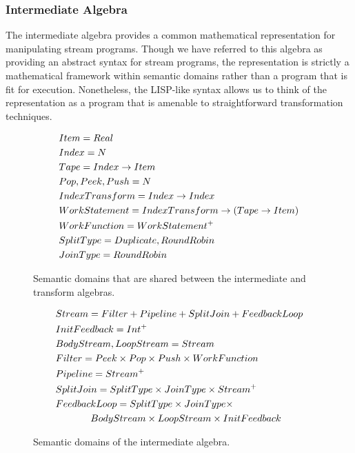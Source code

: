 \subsubsection{Intermediate Algebra}

The intermediate algebra provides a common mathematical representation
for manipulating stream programs.  Though we have referred to this
algebra as providing an abstract syntax for stream programs, the
representation is strictly a mathematical framework within semantic
domains rather than a program that is fit for execution.  Nonetheless,
the LISP-like syntax allows us to think of the representation as a
program that is amenable to straightforward transformation techniques.

\begin{figure}
\begin{align*}
&Item = Real \\
&Index = N \\
&Tape = Index \rightarrow Item \\
&Pop, Peek, Push = N \\ 
&IndexTransform = Index \rightarrow Index \\ 
&WorkStatement = IndexTransform \rightarrow (Tape \rightarrow Item) \\ 
&WorkFunction = WorkStatement^{+} \\
&SplitType = {Duplicate, RoundRobin} \\ 
&JoinType = {RoundRobin}
\end{align*}
\vspace{-18pt}
\caption{Semantic domains that are shared between the intermediate and
  transform algebras.
\protect\label{fig:shareddom}}
\vspace{-6pt}
\begin{align*}
&Stream = Filter + Pipeline + SplitJoin + FeedbackLoop \\
&InitFeedback = Int^{+} \\
&BodyStream, LoopStream = Stream \\
&Filter = Peek \times Pop \times Push \times WorkFunction \\
&Pipeline = Stream^{+} \\
&SplitJoin = SplitType \times JoinType \times Stream^{+} \\
&FeedbackLoop = SplitType \times JoinType \times \\
& \hspace{0.5in} BodyStream \times LoopStream \times InitFeedback
\end{align*}
\vspace{-18pt}
\caption{Semantic domains of the intermediate algebra.
\protect\label{fig:interdom}}
\end{figure}


